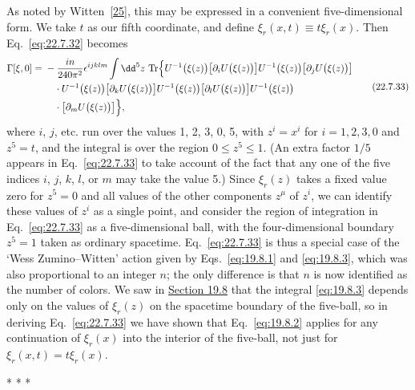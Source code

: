 As noted by Witten~\hyperref[ch22-ref-25]{[25]}, this may be expressed in
a convenient five-dimensional form. We take $t$ as our fifth coordinate,
and define $\xi_r(x,t)\equiv t\xi_r(x)$. Then Eq.~\eqref{eq:22.7.32}
becomes
\begin{equation}
 \begin{aligned}
 \Gamma[\xi,0]
 ={}&-\frac{in}{240\pi^2}\epsilon^{ijklm}\int \dd^5z\,
 \operatorname{Tr}\Bigl\{
 U^{-1}\bigl(\xi(z)\bigr)
 \bigl[\partial_iU\bigl(\xi(z)\bigr)\bigr]
 U^{-1}\bigl(\xi(z)\bigr)
 \bigl[\partial_jU\bigl(\xi(z)\bigr)\bigr]
 \\
 &\quad{}\cdot
 U^{-1}\bigl(\xi(z)\bigr)
 \bigl[\partial_kU\bigl(\xi(z)\bigr)\bigr]
 U^{-1}\bigl(\xi(z)\bigr)
 \bigl[\partial_lU\bigl(\xi(z)\bigr)\bigr]
 U^{-1}\bigl(\xi(z)\bigr)
 \\
 &\quad{}\cdot
 \bigl[\partial_mU\bigl(\xi(z)\bigr)\bigr]
 \Bigr\},
 \end{aligned}
 \tag{22.7.33}\label{eq:22.7.33}
\end{equation}
where $i$, $j$, etc. run over the values 1, 2, 3, 0, 5, with $z^i=x^i$
for $i=1,2,3,0$ and $z^5=t$, and the integral is over the region
$0\leq z^5\leq1$. (An extra factor $1/5$ appears in
Eq.~\eqref{eq:22.7.33} to take account of the fact that any one of the
five indices $i$, $j$, $k$, $l$, or $m$ may take the value 5.) Since
$\xi_r(z)$ takes a fixed value zero for $z^5=0$ and all values of the other
components $z^\mu$ of $z^i$, we can identify these values of $z^i$ as a
single point, and consider the region of integration in
Eq.~\eqref{eq:22.7.33} as a five-dimensional ball, with the
four-dimensional boundary $z^5=1$ taken as ordinary spacetime.
Eq.~\eqref{eq:22.7.33} is thus a special case of the
`Wess Zumino--Witten' action given by Eqs.~\eqref{eq:19.8.1} and
\eqref{eq:19.8.3}, which was also proportional to an integer $n$; the
only difference is that $n$ is now identified as the number of colors.
We saw in \hyperref[sec:19.8]{Section 19.8} that the integral
\eqref{eq:19.8.3} depends only on the values of $\xi_r(z)$ on the
spacetime boundary of the five-ball, so in deriving
Eq.~\eqref{eq:22.7.33} we have shown that Eq.~\eqref{eq:19.8.2} applies
for any continuation of $\xi_r(x)$ into the interior of the five-ball,
not just for $\xi_r(x,t)=t\xi_r(x)$.

\begin{center}
  * * *
\end{center}

